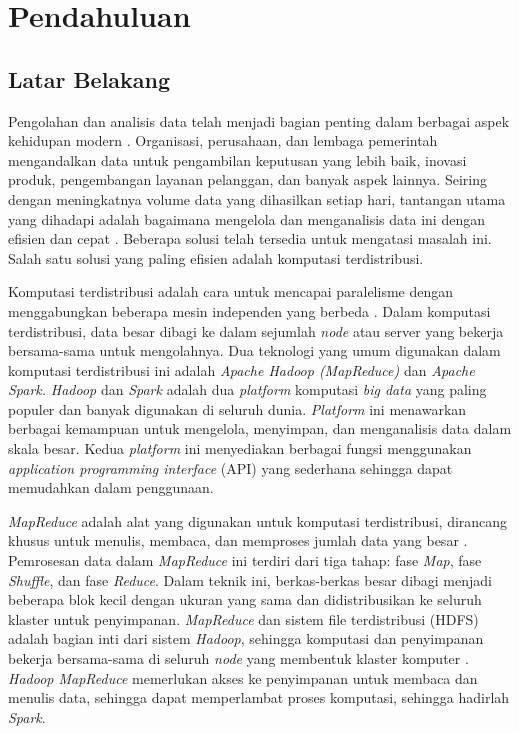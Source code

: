 \chapter{Pendahuluan}

\pagestyle{plain}

\section{Latar Belakang}

Pengolahan dan analisis data telah menjadi bagian penting dalam berbagai aspek kehidupan modern \cite{vermaBigDataManagement2016}. Organisasi, perusahaan, dan lembaga pemerintah mengandalkan data untuk pengambilan keputusan yang lebih baik, inovasi produk, pengembangan layanan pelanggan, dan banyak aspek lainnya. Seiring dengan meningkatnya volume data yang dihasilkan setiap hari, tantangan utama yang dihadapi adalah bagaimana mengelola dan menganalisis data ini dengan efisien dan cepat \cite{ahmadvandGapproxUsingGallup2019}. Beberapa solusi telah tersedia untuk mengatasi masalah ini. Salah satu solusi yang paling efisien adalah komputasi terdistribusi. 

Komputasi terdistribusi adalah cara untuk mencapai paralelisme dengan menggabungkan beberapa mesin independen yang berbeda \cite{bhattacharyaEvaluatingDistributedComputing2021}. Dalam komputasi terdistribusi, data besar dibagi ke dalam sejumlah \textit{node} atau server yang bekerja bersama-sama untuk mengolahnya. Dua teknologi yang umum digunakan dalam komputasi terdistribusi ini adalah \textit{Apache Hadoop (MapReduce)} dan \textit{Apache Spark.} \textit{Hadoop} dan \textit{Spark} adalah dua \textit{platform} komputasi \textit{big data} yang paling populer dan banyak digunakan di seluruh dunia. \textit{Platform} ini menawarkan berbagai kemampuan untuk mengelola, menyimpan, dan menganalisis data dalam skala besar. Kedua \textit{platform} ini menyediakan berbagai fungsi menggunakan \textit{application programming interface} (API) yang sederhana sehingga dapat memudahkan dalam penggunaan.

\textit{MapReduce} adalah alat yang digunakan untuk komputasi terdistribusi, dirancang khusus untuk menulis, membaca, dan memproses jumlah data yang besar \cite{deanMapReduceSimplifiedData2004}. Pemrosesan data dalam \textit{MapReduce} ini terdiri dari tiga tahap: fase \textit{Map}, fase \textit{Shuffle}, dan fase \textit{Reduce}. Dalam teknik ini, berkas-berkas besar dibagi menjadi beberapa blok kecil dengan ukuran yang sama dan didistribusikan ke seluruh klaster untuk penyimpanan. \textit{MapReduce} dan sistem file terdistribusi (HDFS) adalah bagian inti dari sistem \textit{Hadoop}, sehingga komputasi dan penyimpanan bekerja bersama-sama di seluruh \textit{node} yang membentuk klaster komputer \cite{samadiComparativeStudyHadoop2016}. \textit{Hadoop MapReduce} memerlukan akses ke penyimpanan untuk membaca dan menulis data, sehingga dapat memperlambat proses komputasi, sehingga hadirlah \textit{Spark}.

